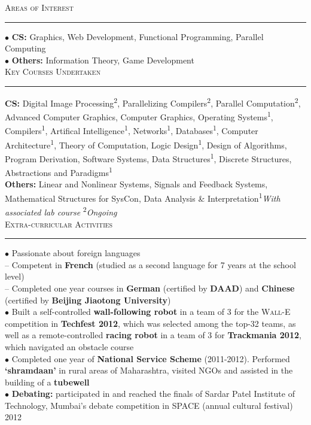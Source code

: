 \documentclass[a4paper,9pt]{article}
\begin{document}
\Large{\textsc{Areas of Interest}}\vspace{1.5pt}
\hrule\vspace{0.25cm}
\small
$\bullet$ \textbf{CS:} Graphics, Web Development, Functional Programming, Parallel Computing\\
$\bullet$ \textbf{Others:} Information Theory, Game Development\\

\Large{\textsc{Key Courses Undertaken}}\vspace{1.5pt}
\hrule\vspace{0.25cm}
\small
\textbf{CS:} Digital Image Processing\textsuperscript{2}, Parallelizing Compilers\textsuperscript{2}, Parallel Computation\textsuperscript{2}, Advanced Computer Graphics, Computer Graphics, Operating Systems\textsuperscript{1}, Compilers\textsuperscript{1}, Artifical Intelligence\textsuperscript{1}, Networks\textsuperscript{1}, Databases\textsuperscript{1}, Computer Architecture\textsuperscript{1}, Theory of Computation, Logic Design\textsuperscript{1}, Design of Algorithms, Program Derivation, Software Systems, Data Structures\textsuperscript{1}, Discrete Structures, Abstractions and Paradigms\textsuperscript{1}\\
\textbf{Others:} Linear and Nonlinear Systems, Signals and Feedback Systems, Mathematical Structures for SysCon, Data Analysis \& Interpretation\hfill\textsuperscript{1}\emph{With associated lab course} \textsuperscript{2}\emph{Ongoing}\\

\Large{\textsc{Extra-curricular Activities}}\vspace{1.5pt}
\hrule\vspace{0.25cm}
\small
$\bullet$ Passionate about foreign languages\\
-- Competent in \textbf{French} (studied as a second language for 7 years at the school level)\\
-- Completed one year courses in \textbf{German} (certified by \textbf{DAAD}) and \textbf{Chinese} (certified by \textbf{Beijing Jiaotong University})\\
$\bullet$ Built a self-controlled \textbf{wall-following robot} in a team of 3 for the \textsc{Wall-E} competition in \textbf{Techfest 2012}, which was selected among the top-32 teams, as well as a remote-controlled \textbf{racing robot} in a team of 3 for \textbf{Trackmania 2012}, which navigated an obstacle course\\
$\bullet$ Completed one year of \textbf{National Service Scheme} (2011-2012). Performed \textbf{‘shramdaan’} in rural areas of Maharashtra, visited NGOs and assisted in the building of a \textbf{tubewell}\\
$\bullet$ \textbf{Debating:} participated in and reached the finals of Sardar Patel Institute of Technology, Mumbai's debate competition in SPACE (annual cultural festival) 2012\\
\end{document}
